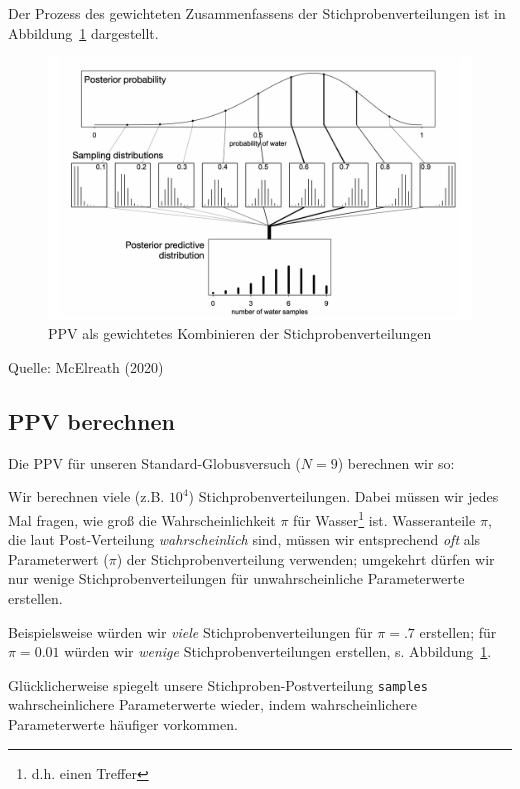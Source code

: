 \documentclass[
  a4paper,
  DIV=11]{scrreprt}
\theoremstyle{definition}
\theoremstyle{remark}
\begin{document}
Der Prozess des gewichteten Zusammenfassens der Stichprobenverteilungen
ist in Abbildung~\ref{fig-ppv} dargestellt.

\begin{figure}

{\centering \includegraphics{./img/ppv.png}

}

\caption{\label{fig-ppv}PPV als gewichtetes Kombinieren der
Stichprobenverteilungen}

\end{figure}

Quelle: McElreath (2020)

\hypertarget{ppv-berechnen}{%
\subsection{PPV berechnen}\label{ppv-berechnen}}

Die PPV für unseren Standard-Globusversuch (\(N=9\)) berechnen wir so:

Wir berechnen viele (z.B. \(10^4\)) Stichprobenverteilungen. Dabei
müssen wir jedes Mal fragen, wie groß die Wahrscheinlichkeit \(\pi\) für
Wasser\footnote{d.h. einen Treffer} ist. Wasseranteile \(\pi\), die laut
Post-Verteilung \emph{wahrscheinlich} sind, müssen wir entsprechend
\emph{oft} als Parameterwert (\(\pi\)) der Stichprobenverteilung
verwenden; umgekehrt dürfen wir nur wenige Stichprobenverteilungen für
unwahrscheinliche Parameterwerte erstellen.

Beispielsweise würden wir \emph{viele} Stichprobenverteilungen für
\(\pi=.7\) erstellen; für \(\pi=0.01\) würden wir \emph{wenige}
Stichprobenverteilungen erstellen, s. Abbildung~\ref{fig-ppv}.

Glücklicherweise spiegelt unsere Stichproben-Postverteilung
\texttt{samples} wahrscheinlichere Parameterwerte wieder, indem
wahrscheinlichere Parameterwerte häufiger vorkommen.
\end{document}
